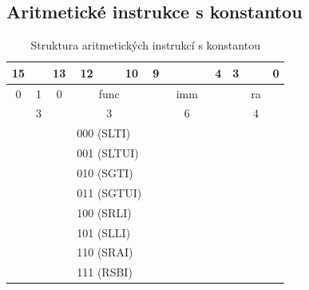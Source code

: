 \documentclass[
  digital, %
  color,   %
  table,   %
  twoside, %
  nolof,   %
  nolot,   %
]{fithesis3}
\begin{document}
\subsection{Aritmetické instrukce s konstantou}
\label{subsec:arithc}
\begin{table}[H]
\caption{Struktura aritmetických instrukcí s konstantou}
\begin{tabular}{llllccccccccclll}
\multicolumn{1}{c}{15} & \multicolumn{1}{c}{} & \multicolumn{1}{c}{13} & \multicolumn{1}{c}{12} &  & 10 & 9 &  &  &  &  & 4 & 3 & \multicolumn{1}{c}{} & \multicolumn{1}{c}{} & \multicolumn{1}{c}{0} \\ \hline
\multicolumn{1}{|c}{0} & \multicolumn{1}{c}{1} & \multicolumn{1}{c|}{0} & \multicolumn{3}{c|}{func} & \multicolumn{6}{c|}{imm} & \multicolumn{4}{c|}{ra} \\ \hline
\multicolumn{3}{c}{{\color[HTML]{656565} 3}} & \multicolumn{3}{c}{{\color[HTML]{656565} 3}} & \multicolumn{6}{c}{{\color[HTML]{656565} 6}} & \multicolumn{4}{c}{{\color[HTML]{656565} 4}} \\
\multicolumn{1}{c}{} & \multicolumn{1}{c}{} &  & \multicolumn{3}{l}{000 (SLTI)} &  &  &  &  &  &  &  & \multicolumn{1}{c}{} & \multicolumn{1}{c}{} & \multicolumn{1}{c}{} \\
\multicolumn{1}{c}{} & \multicolumn{1}{c}{} &  & \multicolumn{3}{l}{001 (SLTUI)} &  &  &  &  &  &  &  & \multicolumn{1}{c}{} & \multicolumn{1}{c}{} & \multicolumn{1}{c}{} \\
 &  &  & \multicolumn{3}{l}{010 (SGTI)} &  &  &  &  &  &  &  &  &  &  \\
 &  &  & \multicolumn{3}{l}{011 (SGTUI)} &  &  &  &  &  &  &  &  &  &  \\
 &  &  & \multicolumn{3}{l}{100 (SRLI)} & \multicolumn{1}{l}{} & \multicolumn{1}{l}{} & \multicolumn{1}{l}{} & \multicolumn{1}{l}{} & \multicolumn{1}{l}{} & \multicolumn{1}{l}{} & \multicolumn{1}{l}{} &  &  &  \\
 &  &  & \multicolumn{3}{l}{101 (SLLI)} & \multicolumn{1}{l}{} & \multicolumn{1}{l}{} & \multicolumn{1}{l}{} & \multicolumn{1}{l}{} & \multicolumn{1}{l}{} & \multicolumn{1}{l}{} & \multicolumn{1}{l}{} &  &  &  \\
 &  &  & \multicolumn{3}{l}{110 (SRAI)} & \multicolumn{1}{l}{} & \multicolumn{1}{l}{} & \multicolumn{1}{l}{} & \multicolumn{1}{l}{} & \multicolumn{1}{l}{} & \multicolumn{1}{l}{} & \multicolumn{1}{l}{} &  &  &  \\
 &  &  & \multicolumn{3}{l}{111 (RSBI)} & \multicolumn{1}{l}{} & \multicolumn{1}{l}{} & \multicolumn{1}{l}{} & \multicolumn{1}{l}{} & \multicolumn{1}{l}{} & \multicolumn{1}{l}{} & \multicolumn{1}{l}{} &  &  & 
\end{tabular}
\end{table}
\end{document}
